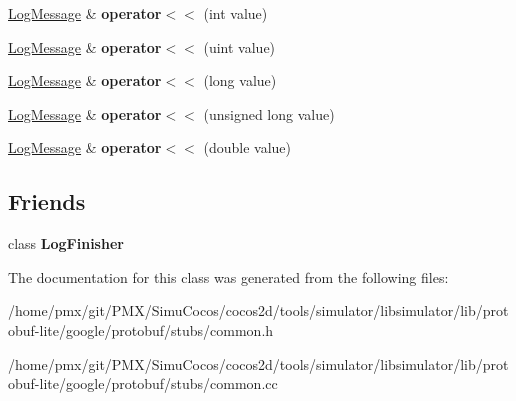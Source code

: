 \begin{DoxyCompactItemize}
\item 
\mbox{\label{classgoogle_1_1protobuf_1_1internal_1_1LogMessage_a9d1a9708815ac3257433145d1c3e76d8}} 
\hyperlink{classgoogle_1_1protobuf_1_1internal_1_1LogMessage}{Log\+Message} \& {\bfseries operator$<$$<$} (int value)
\item 
\mbox{\label{classgoogle_1_1protobuf_1_1internal_1_1LogMessage_acb7f1fe7f5b86ccac812b51b20585b0d}} 
\hyperlink{classgoogle_1_1protobuf_1_1internal_1_1LogMessage}{Log\+Message} \& {\bfseries operator$<$$<$} (uint value)
\item 
\mbox{\label{classgoogle_1_1protobuf_1_1internal_1_1LogMessage_acb9fc449848d99038822fbeef7d26f2a}} 
\hyperlink{classgoogle_1_1protobuf_1_1internal_1_1LogMessage}{Log\+Message} \& {\bfseries operator$<$$<$} (long value)
\item 
\mbox{\label{classgoogle_1_1protobuf_1_1internal_1_1LogMessage_aed771017a3e433cbb769c0c6d20008c1}} 
\hyperlink{classgoogle_1_1protobuf_1_1internal_1_1LogMessage}{Log\+Message} \& {\bfseries operator$<$$<$} (unsigned long value)
\item 
\mbox{\label{classgoogle_1_1protobuf_1_1internal_1_1LogMessage_a45a6665be231147a0f3369cc69c7bd78}} 
\hyperlink{classgoogle_1_1protobuf_1_1internal_1_1LogMessage}{Log\+Message} \& {\bfseries operator$<$$<$} (double value)
\end{DoxyCompactItemize}
\subsection*{Friends}
\begin{DoxyCompactItemize}
\item 
\mbox{\label{classgoogle_1_1protobuf_1_1internal_1_1LogMessage_a8ff29ed23ed370db22b6cf316d226f53}} 
class {\bfseries Log\+Finisher}
\end{DoxyCompactItemize}


The documentation for this class was generated from the following files\+:\begin{DoxyCompactItemize}
\item 
/home/pmx/git/\+P\+M\+X/\+Simu\+Cocos/cocos2d/tools/simulator/libsimulator/lib/protobuf-\/lite/google/protobuf/stubs/common.\+h\item 
/home/pmx/git/\+P\+M\+X/\+Simu\+Cocos/cocos2d/tools/simulator/libsimulator/lib/protobuf-\/lite/google/protobuf/stubs/common.\+cc\end{DoxyCompactItemize}
